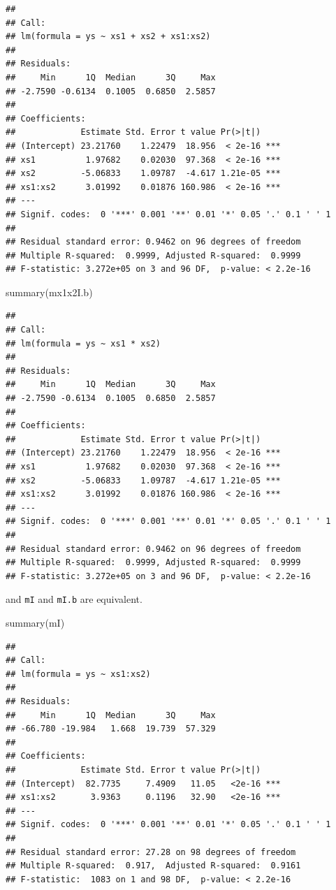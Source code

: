 \documentclass[
]{book}
\newenvironment{Shaded}{\begin{snugshade}}{\end{snugshade}}
\newcommand{\FunctionTok}[1]{\textcolor[rgb]{0.00,0.00,0.00}{#1}}
\newcommand{\NormalTok}[1]{#1}
\begin{document}
\begin{verbatim}
## 
## Call:
## lm(formula = ys ~ xs1 + xs2 + xs1:xs2)
## 
## Residuals:
##     Min      1Q  Median      3Q     Max 
## -2.7590 -0.6134  0.1005  0.6850  2.5857 
## 
## Coefficients:
##             Estimate Std. Error t value Pr(>|t|)    
## (Intercept) 23.21760    1.22479  18.956  < 2e-16 ***
## xs1          1.97682    0.02030  97.368  < 2e-16 ***
## xs2         -5.06833    1.09787  -4.617 1.21e-05 ***
## xs1:xs2      3.01992    0.01876 160.986  < 2e-16 ***
## ---
## Signif. codes:  0 '***' 0.001 '**' 0.01 '*' 0.05 '.' 0.1 ' ' 1
## 
## Residual standard error: 0.9462 on 96 degrees of freedom
## Multiple R-squared:  0.9999, Adjusted R-squared:  0.9999 
## F-statistic: 3.272e+05 on 3 and 96 DF,  p-value: < 2.2e-16
\end{verbatim}

\begin{Shaded}
\begin{Highlighting}[]
\FunctionTok{summary}\NormalTok{(mx1x2I.b)}
\end{Highlighting}
\end{Shaded}

\begin{verbatim}
## 
## Call:
## lm(formula = ys ~ xs1 * xs2)
## 
## Residuals:
##     Min      1Q  Median      3Q     Max 
## -2.7590 -0.6134  0.1005  0.6850  2.5857 
## 
## Coefficients:
##             Estimate Std. Error t value Pr(>|t|)    
## (Intercept) 23.21760    1.22479  18.956  < 2e-16 ***
## xs1          1.97682    0.02030  97.368  < 2e-16 ***
## xs2         -5.06833    1.09787  -4.617 1.21e-05 ***
## xs1:xs2      3.01992    0.01876 160.986  < 2e-16 ***
## ---
## Signif. codes:  0 '***' 0.001 '**' 0.01 '*' 0.05 '.' 0.1 ' ' 1
## 
## Residual standard error: 0.9462 on 96 degrees of freedom
## Multiple R-squared:  0.9999, Adjusted R-squared:  0.9999 
## F-statistic: 3.272e+05 on 3 and 96 DF,  p-value: < 2.2e-16
\end{verbatim}

and \texttt{mI} and \texttt{mI.b} are equivalent.

\begin{Shaded}
\begin{Highlighting}[]
\FunctionTok{summary}\NormalTok{(mI)}
\end{Highlighting}
\end{Shaded}

\begin{verbatim}
## 
## Call:
## lm(formula = ys ~ xs1:xs2)
## 
## Residuals:
##     Min      1Q  Median      3Q     Max 
## -66.780 -19.984   1.668  19.739  57.329 
## 
## Coefficients:
##             Estimate Std. Error t value Pr(>|t|)    
## (Intercept)  82.7735     7.4909   11.05   <2e-16 ***
## xs1:xs2       3.9363     0.1196   32.90   <2e-16 ***
## ---
## Signif. codes:  0 '***' 0.001 '**' 0.01 '*' 0.05 '.' 0.1 ' ' 1
## 
## Residual standard error: 27.28 on 98 degrees of freedom
## Multiple R-squared:  0.917,  Adjusted R-squared:  0.9161 
## F-statistic:  1083 on 1 and 98 DF,  p-value: < 2.2e-16
\end{verbatim}
\end{document}
